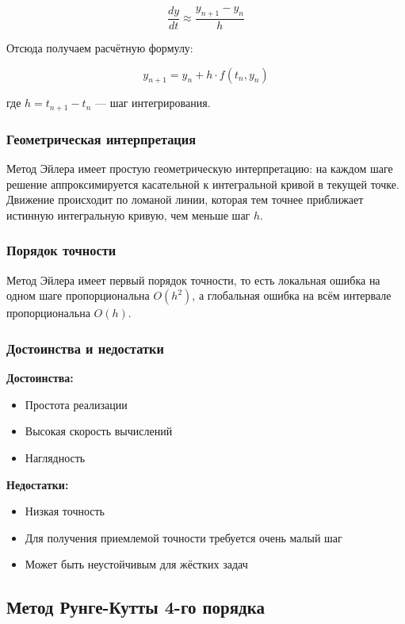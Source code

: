 \documentclass[a4paper,12pt]{article}
\begin{document}
\[
\frac{dy}{dt} \approx \frac{y_{n+1} - y_n}{h}
\]

Отсюда получаем расчётную формулу:

\begin{equation}
    y_{n+1} = y_n + h \cdot f(t_n, y_n) \label{eq:euler}
\end{equation}

где \(h = t_{n+1} - t_n\) — шаг интегрирования.

\subsubsection{Геометрическая интерпретация}
Метод Эйлера имеет простую геометрическую интерпретацию: на каждом шаге решение аппроксимируется касательной к интегральной кривой в текущей точке. Движение происходит по ломаной линии, которая тем точнее приближает истинную интегральную кривую, чем меньше шаг \(h\).

\subsubsection{Порядок точности}
Метод Эйлера имеет первый порядок точности, то есть локальная ошибка на одном шаге пропорциональна \(O(h^2)\), а глобальная ошибка на всём интервале пропорциональна \(O(h)\).

\subsubsection{Достоинства и недостатки}
\textbf{Достоинства:}
\begin{itemize}
    \item Простота реализации
    \item Высокая скорость вычислений
    \item Наглядность
\end{itemize}

\textbf{Недостатки:}
\begin{itemize}
    \item Низкая точность
    \item Для получения приемлемой точности требуется очень малый шаг
    \item Может быть неустойчивым для жёстких задач
\end{itemize}

\subsection{Метод Рунге-Кутты 4-го порядка}
\end{document}
